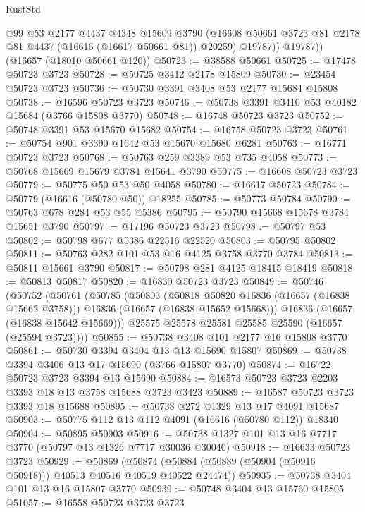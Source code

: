 \begin{lexlean}{RustStd}
\begin{coremodule}
            @99
            @53
            @2177
            @4437
            @4348
            @15609
            @3790
            (@16608 @50661 @3723 @81 @2178 @81 @4437 (@16616 (@16617 @50661 @81)) @20259)
            @19787))
        @19787))
    (@16657 (@18010 @50661 @120))
@50723 := @38588 @50661
@50725 := @17478 @50723 @3723
@50728 := @50725 @3412 @2178 @15809
@50730 := @23454 @50723 @3723
@50736 := @50730 @3391 @3408 @53 @2177 @15684 @15808
@50738 := @16596 @50723 @3723
@50746 := @50738 @3391 @3410 @53 @40182 @15684 (@3766 @15808 @3770)
@50748 := @16748 @50723 @3723
@50752 := @50748 @3391 @53 @15670 @15682
@50754 := @16758 @50723 @3723
@50761 := @50754 @901 @3390 @1642 @53 @15670 @15680 @6281
@50763 := @16771 @50723 @3723
@50768 := @50763 @259 @3389 @53 @735 @4058
@50773 := @50768 @15669 @15679 @3784 @15641 @3790
@50775 := @16608 @50723 @3723
@50779 := @50775 @50 @53 @50 @4058
@50780 := @16617 @50723
@50784 := @50779 (@16616 (@50780 @50)) @18255
@50785 := @50773 @50784
@50790 := @50763 @678 @284 @53 @55 @5386
@50795 := @50790 @15668 @15678 @3784 @15651 @3790
@50797 := @17196 @50723 @3723
@50798 := @50797 @53
@50802 := @50798 @677 @5386 @22516 @22520
@50803 := @50795 @50802
@50811 := @50763 @282 @101 @53 @16 @4125 @3758 @3770 @3784
@50813 := @50811 @15661 @3790
@50817 := @50798 @281 @4125 @18415 @18419
@50818 := @50813 @50817
@50820 := @16830 @50723 @3723
@50849 := @50746
    (@50752
      (@50761
        (@50785
          (@50803
            (@50818 @50820 @16836 (@16657 (@16838 @15662 @3758)))
            @16836
            (@16657 (@16838 @15652 @15668)))
          @16836
          (@16657 (@16838 @15642 @15669)))
        @25575
        @25578
        @25581
        @25585
        @25590
        (@16657 (@25594 @3723))))
@50855 := @50738 @3408 @101 @2177 @16 @15808 @3770
@50861 := @50730 @3394 @3404 @13 @13 @15690 @15807
@50869 := @50738 @3394 @3406 @13 @17 @15690 (@3766 @15807 @3770)
@50874 := @16722 @50723 @3723 @3394 @13 @15690
@50884 := @16573 @50723 @3723 @2203 @3393 @18 @13 @3758 @15688 @3723 @3423
@50889 := @16587 @50723 @3723 @3393 @18 @15688
@50895 := @50738 @272 @1329 @13 @17 @4091 @15687
@50903 := @50775 @112 @13 @112 @4091 (@16616 (@50780 @112)) @18340
@50904 := @50895 @50903
@50916 := @50738 @1327 @101 @13 @16 @7717 @3770 (@50797 @13 @1326 @7717 @30036 @30040)
@50918 := @16633 @50723 @3723
@50929 := @50869
    (@50874 (@50884 (@50889 (@50904 (@50916 @50918))) @40513 @40516 @40519 @40522 @24474))
@50935 := @50738 @3404 @101 @13 @16 @15807 @3770
@50939 := @50748 @3404 @13 @15760 @15805
@51057 := @16558
    @50723
    @3723
    @3723

\end{coremodule}
\end{lexlean}
